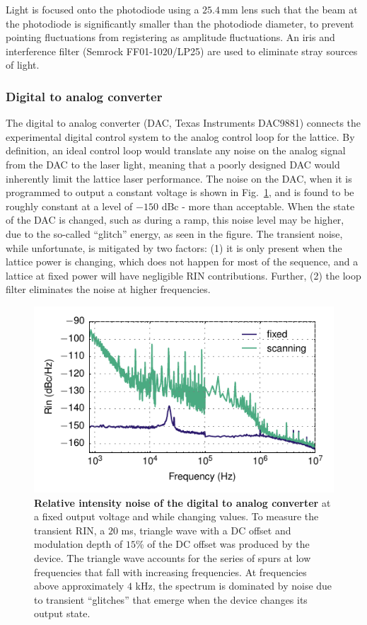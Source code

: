 \documentclass[twocolumn,aps,pra,showpacs,preprintnumbers,bibnotes]{revtex4-1}
\begin{document}
Light is focused onto the photodiode using a $25.4\,$mm lens such that the beam at the photodiode is significantly smaller than the photodiode diameter, to prevent pointing fluctuations from registering as amplitude fluctuations.
An iris and interference filter (Semrock FF01-1020/LP25) are used to eliminate stray sources of light.


\subsubsection{Digital to analog converter}
The digital to analog converter (DAC, Texas Instruments DAC9881) connects the experimental digital control system to the analog control loop for the lattice.
By definition, an ideal control loop would translate any noise on the analog signal from the DAC to the laser light, meaning that a poorly designed DAC would inherently limit the lattice laser performance.
The noise on the DAC, when it is programmed to output a constant voltage is shown in Fig.~\ref{fig:da_rin}, and is found to be roughly constant at a level of $-150$ dBc - more than acceptable.
When the state of the DAC is changed, such as during a ramp, this noise level may be higher, due to the so-called ``glitch'' energy, as seen in the figure.
The transient noise, while unfortunate, is mitigated by two factors: (1) it is only present when the lattice power is changing, which does not happen for most of the sequence, and a lattice at fixed power will have negligible RIN contributions. Further, (2) the loop filter eliminates the noise at higher frequencies.

\begin{figure}
  \begin{center}
    \includegraphics{fig/da_rin_scan.pdf}
    \caption{\textbf{Relative intensity noise of the digital to analog converter} at a fixed output voltage and while changing values. To measure the transient RIN, a $20$ ms, triangle wave with a DC offset and modulation depth of $15$\% of the DC offset was produced by the device. The triangle wave accounts for the series of spurs at low frequencies that fall with increasing frequencies. At frequencies above approximately $4$ kHz, the spectrum is dominated by noise due to transient ``glitches'' that emerge when the device changes its output state.}\label{fig:da_rin}
  \end{center}
\end{figure}
\end{document}
